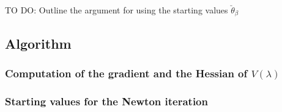 \bigskip
TO DO: Outline the argument for using the starting values $\breve{\theta}_\beta$
\bigskip

\subsection{Algorithm}

\subsubsection{Computation of the gradient and the Hessian of $V\left(\lambda\right)$}

\subsubsection{Starting values for the Newton iteration}


